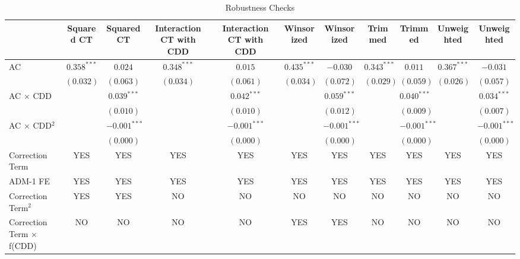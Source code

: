 
\begin{table}[H]
\caption{Robustness Checks}
\begin{center}
\begin{tabular}{l c c c c c c c c c c}
\hline
 & Squared CT & Squared CT & Interaction CT with CDD & Interaction CT with CDD & Winsorized & Winsorized & Trimmed & Trimmed & Unweighted & Unweighted \\
\hline
AC                              & $0.358^{***}$ & $0.024$        & $0.348^{***}$ & $0.015$        & $0.435^{***}$ & $-0.030$       & $0.343^{***}$ & $0.011$        & $0.367^{***}$ & $-0.031$       \\
                                & $(0.032)$     & $(0.063)$      & $(0.034)$     & $(0.061)$      & $(0.034)$     & $(0.072)$      & $(0.029)$     & $(0.059)$      & $(0.026)$     & $(0.057)$      \\
AC $\times$ CDD                 &               & $0.039^{***}$  &               & $0.042^{***}$  &               & $0.059^{***}$  &               & $0.040^{***}$  &               & $0.034^{***}$  \\
                                &               & $(0.010)$      &               & $(0.010)$      &               & $(0.012)$      &               & $(0.009)$      &               & $(0.007)$      \\
AC $\times$ CDD$^2$             &               & $-0.001^{***}$ &               & $-0.001^{***}$ &               & $-0.001^{***}$ &               & $-0.001^{***}$ &               & $-0.001^{***}$ \\
                                &               & $(0.000)$      &               & $(0.000)$      &               & $(0.000)$      &               & $(0.000)$      &               & $(0.000)$      \\
\hline
Correction Term                 & YES           & YES            & YES           & YES            & YES           & YES            & YES           & YES            & YES           & YES            \\
ADM-1 FE                        & YES           & YES            & YES           & YES            & YES           & YES            & YES           & YES            & YES           & YES            \\
Correction Term$^2$             & YES           & YES            & NO            & NO             & NO            & NO             & NO            & NO             & NO            & NO             \\
Correction Term $\times$ f(CDD) & NO            & NO             & NO            & NO             & YES           & YES            & NO            & NO             & NO            & NO             \\

\end{tabular}
\end{center}
\end{table}
